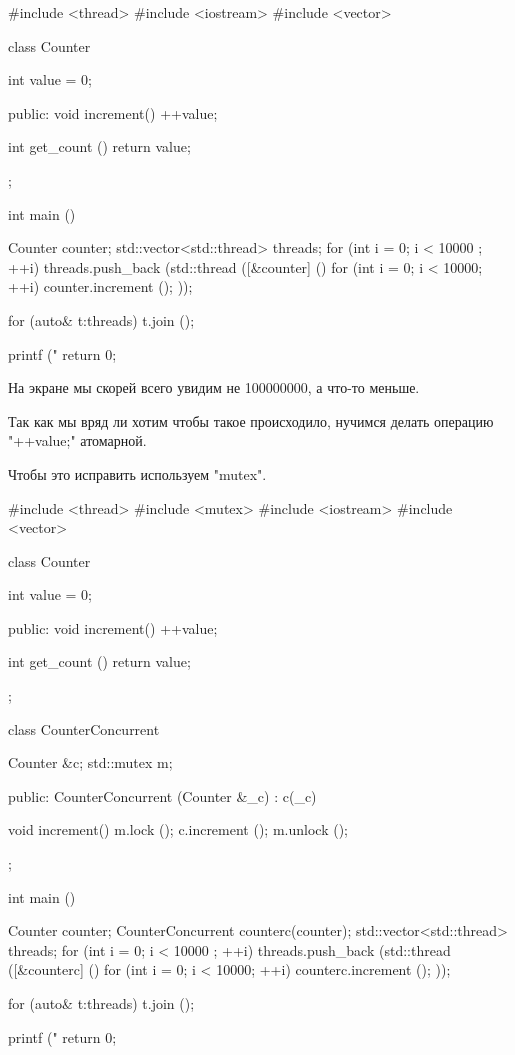 \begin{cppcode}
#include <thread>
#include <iostream>
#include <vector>

class Counter {
  int value = 0;

public:
  void increment() {
    ++value;
  }

  int get_count () {
    return value;
  }
};

int main () {
  Counter counter;
  std::vector<std::thread> threads;
  for (int i = 0; i < 10000 ; ++i) {
    threads.push_back (std::thread ([&counter] () {
        for (int i = 0; i < 10000; ++i) {
          counter.increment ();
        }
    }));
  }

  for (auto& t:threads) {
    t.join ();
  }

  printf ("%
  return 0;
}
\end{cppcode}

На экране мы скорей всего увидим не 100000000, а что-то меньше.

Так как мы вряд ли хотим чтобы такое происходило, нучимся делать операцию \cpp"++value;" атомарной.


Чтобы это исправить используем \cpp"mutex".

\begin{cppcode}
#include <thread>
#include <mutex>
#include <iostream>
#include <vector>


class Counter {
  int value = 0;

public:
  void increment() {
    ++value;
  }

  int get_count () {
    return value;
  }
};

class CounterConcurrent {
  Counter &c;
  std::mutex m;

public:
  CounterConcurrent (Counter &_c) : c(_c){
  }

  void increment() {
    m.lock ();
    c.increment ();
    m.unlock ();
  }
};


int main () {
  Counter counter;
  CounterConcurrent counterc(counter);
  std::vector<std::thread> threads;
  for (int i = 0; i < 10000 ; ++i) {
    threads.push_back (std::thread ([&counterc] () {
        for (int i = 0; i < 10000; ++i) {
          counterc.increment ();
        }
    }));
  }

  for (auto& t:threads) {
    t.join ();
  }

  printf ("%
  return 0;
}
\end{cppcode}



